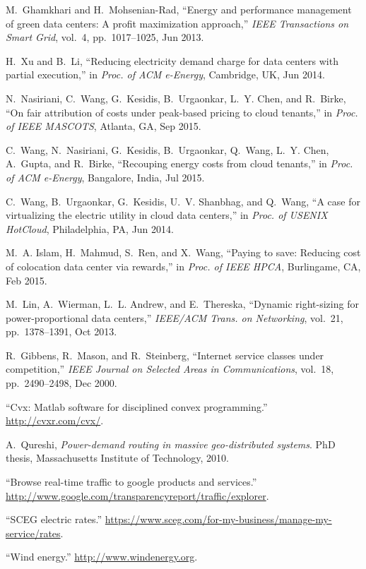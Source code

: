 \documentclass[conference]{IEEEtran}
\begin{document}
\begin{thebibliography}{10}
M.~Ghamkhari and H.~Mohsenian-Rad, ``Energy and performance management of green
  data centers: A profit maximization approach,'' {\em IEEE Transactions on
  Smart Grid}, vol.~4, pp.~1017--1025, Jun 2013.

H.~Xu and B.~Li, ``Reducing electricity demand charge for data centers with
  partial execution,'' in {\em Proc. of ACM e-Energy}, Cambridge,
  UK, Jun 2014.

N.~Nasiriani, C.~Wang, G.~Kesidis, B.~Urgaonkar, L.~Y. Chen, and R.~Birke, ``On
  fair attribution of costs under peak-based pricing to cloud tenants,'' in
  {\em Proc. of IEEE MASCOTS}, Atlanta, GA, Sep 2015.

C.~Wang, N.~Nasiriani, G.~Kesidis, B.~Urgaonkar, Q.~Wang, L.~Y. Chen, A.~Gupta,
  and R.~Birke, ``Recouping energy costs from cloud tenants,'' in {\em Proc. of
  ACM e-Energy}, Bangalore, India, Jul 2015.

C.~Wang, B.~Urgaonkar, G.~Kesidis, U.~V. Shanbhag, and Q.~Wang, ``A case for
  virtualizing the electric utility in cloud data centers,'' in {\em Proc. of
  USENIX HotCloud}, Philadelphia, PA, Jun 2014.

M.~A. Islam, H.~Mahmud, S.~Ren, and X.~Wang, ``Paying to save: Reducing cost of
  colocation data center via rewards,'' in {\em Proc. of IEEE HPCA},  Burlingame, CA, Feb 2015.

M.~Lin, A.~Wierman, L.~L. Andrew, and E.~Thereska, ``Dynamic right-sizing for
  power-proportional data centers,'' {\em IEEE/ACM Trans. on Networking},
  vol.~21, pp.~1378--1391, Oct 2013.

R.~Gibbens, R.~Mason, and R.~Steinberg, ``Internet service classes under
  competition,'' {\em IEEE Journal on Selected Areas in Communications},
  vol.~18, pp.~2490--2498, Dec 2000.

``Cvx: Matlab software for disciplined convex programming.''
  \url{http://cvxr.com/cvx/}.

A.~Qureshi, {\em Power-demand routing in massive geo-distributed systems}.
\newblock PhD thesis, Massachusetts Institute of Technology, 2010.

``Browse real-time traffic to google products and services.''
  \url{http://www.google.com/transparencyreport/traffic/explorer}.

``{SCEG} electric rates.''
  \url{https://www.sceg.com/for-my-business/manage-my-service/rates}.

``Wind energy.'' \url{http://www.windenergy.org}.

\end{thebibliography}
\end{document}
